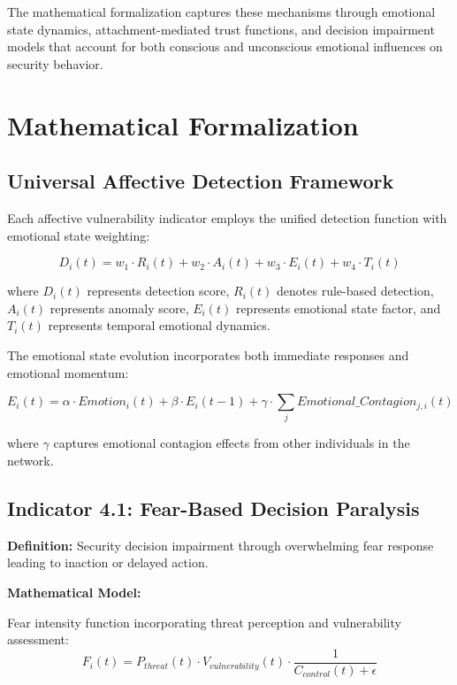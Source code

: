 \documentclass[11pt,a4paper]{article}
\begin{document}
The mathematical formalization captures these mechanisms through emotional state dynamics, attachment-mediated trust functions, and decision impairment models that account for both conscious and unconscious emotional influences on security behavior.

\section{Mathematical Formalization}

\subsection{Universal Affective Detection Framework}

Each affective vulnerability indicator employs the unified detection function with emotional state weighting:

\begin{equation}
D_i(t) = w_1 \cdot R_i(t) + w_2 \cdot A_i(t) + w_3 \cdot E_i(t) + w_4 \cdot T_i(t)
\end{equation}

where $D_i(t)$ represents detection score, $R_i(t)$ denotes rule-based detection, $A_i(t)$ represents anomaly score, $E_i(t)$ represents emotional state factor, and $T_i(t)$ represents temporal emotional dynamics.

The emotional state evolution incorporates both immediate responses and emotional momentum:

\begin{equation}
E_i(t) = \alpha \cdot Emotion_i(t) + \beta \cdot E_i(t-1) + \gamma \cdot \sum_{j} Emotional\_Contagion_{j,i}(t)
\end{equation}

where $\gamma$ captures emotional contagion effects from other individuals in the network.

\subsection{Indicator 4.1: Fear-Based Decision Paralysis}

\textbf{Definition:} Security decision impairment through overwhelming fear response leading to inaction or delayed action.

\textbf{Mathematical Model:}

Fear intensity function incorporating threat perception and vulnerability assessment:
\begin{equation}
F_i(t) = P_{threat}(t) \cdot V_{vulnerability}(t) \cdot \frac{1}{C_{control}(t) + \epsilon}
\end{equation}
\end{document}
